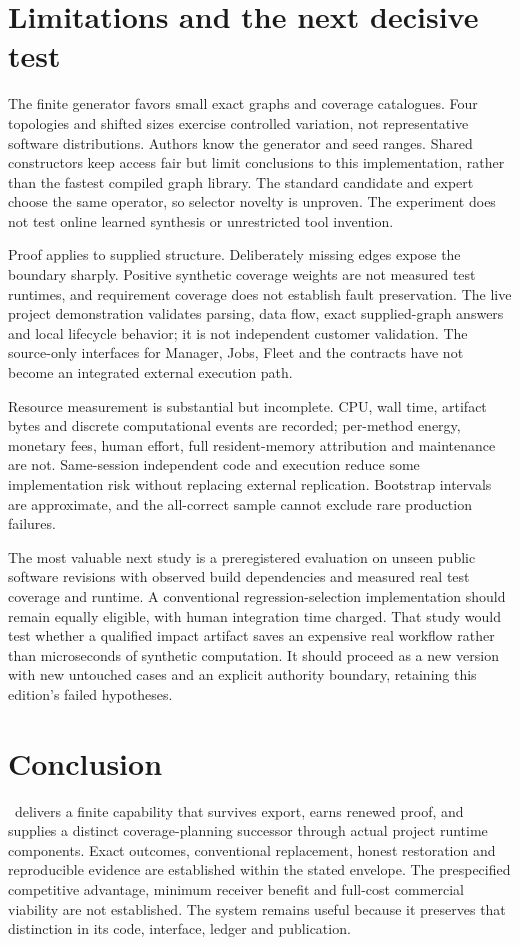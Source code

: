 \FloatBarrier
\section{Limitations and the next decisive test}
The finite generator favors small exact graphs and coverage catalogues. Four topologies and shifted sizes exercise controlled variation, not representative software distributions. Authors know the generator and seed ranges. Shared constructors keep access fair but limit conclusions to this implementation, rather than the fastest compiled graph library. The standard candidate and expert choose the same operator, so selector novelty is unproven. The experiment does not test online learned synthesis or unrestricted tool invention.

Proof applies to supplied structure. Deliberately missing edges expose the boundary sharply. Positive synthetic coverage weights are not measured test runtimes, and requirement coverage does not establish fault preservation. The live project demonstration validates parsing, data flow, exact supplied-graph answers and local lifecycle behavior; it is not independent customer validation. The source-only interfaces for Manager, Jobs, Fleet and the contracts have not become an integrated external execution path.

Resource measurement is substantial but incomplete. CPU, wall time, artifact bytes and discrete computational events are recorded; per-method energy, monetary fees, human effort, full resident-memory attribution and maintenance are not. Same-session independent code and execution reduce some implementation risk without replacing external replication. Bootstrap intervals are approximate, and the all-correct sample cannot exclude rare production failures.

The most valuable next study is a preregistered evaluation on unseen public software revisions with observed build dependencies and measured real test coverage and runtime. A conventional regression-selection implementation should remain equally eligible, with human integration time charged. That study would test whether a qualified impact artifact saves an expensive real workflow rather than microseconds of synthetic computation. It should proceed as a new version with new untouched cases and an explicit authority boundary, retaining this edition's failed hypotheses.

\FloatBarrier
\section{Conclusion}
\bloom\ delivers a finite capability that survives export, earns renewed proof, and supplies a distinct coverage-planning successor through actual project runtime components. Exact outcomes, conventional replacement, honest restoration and reproducible evidence are established within the stated envelope. The prespecified competitive advantage, minimum receiver benefit and full-cost commercial viability are not established. The system remains useful because it preserves that distinction in its code, interface, ledger and publication.

